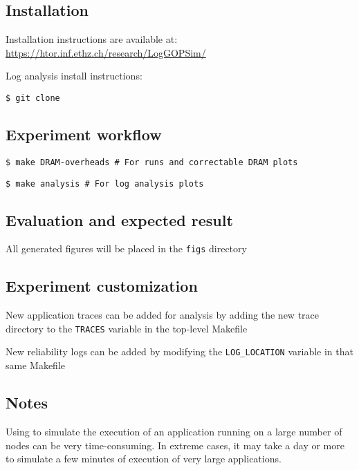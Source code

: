 \subsection{Installation}

Installation instructions are available at: \url{https://htor.inf.ethz.ch/research/LogGOPSim/}

Log analysis install instructions:

{\texttt{\$ git clone }}

\subsection{Experiment workflow}

{\texttt{\$ make DRAM-overheads \# For \LogGOPSim runs and correctable DRAM plots}}

{\texttt{\$ make analysis \# For log analysis plots}}
\subsection{Evaluation and expected result}

All generated figures will be placed in the {\texttt{figs}} directory

\subsection{Experiment customization}

New application traces can be added for analysis by adding the new trace
directory to the {\texttt{TRACES}} variable in the top-level Makefile

New reliability logs can be added by modifying the {\texttt{LOG\_LOCATION}}
variable in that same Makefile

\subsection{Notes}

Using \LogGOPSim to simulate the execution of an application running on 
a large number of nodes can be very time-consuming.  In extreme cases,
it may take a day or more to simulate a few minutes of execution of
very large applications.
